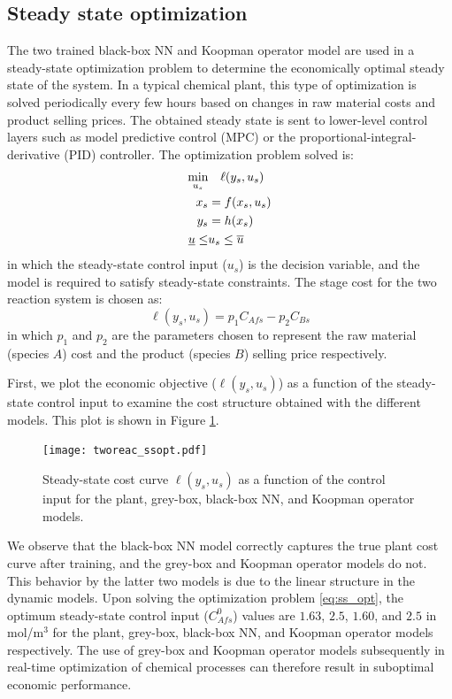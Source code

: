 \documentclass[10pt]{article}
\begin{document}
\subsection{Steady state optimization}
The two trained black-box NN and Koopman operator model are used in a steady-state optimization problem to determine the economically optimal
steady state of the system. In a typical chemical plant, this type of optimization is solved periodically every few hours based on changes in raw material costs and product selling prices. The obtained steady state is sent to lower-level control layers such as model predictive control (MPC) or the proportional-integral-derivative (PID) controller. The optimization problem solved is:
\begin{align} \label{eq:ss_opt}
  \underset{u_s}{\textnormal{min}} & \quad \ell(y_s, u_s) \\
  x_s &= f(x_s, u_s) \nonumber \\ 
  y_s &= h(x_s) \nonumber \\
  \underline{u} \leq &u_s \leq \overline{u} \nonumber
\end{align}
in which the steady-state control input ($u_s$) is the decision variable,  and the model is required to satisfy steady-state constraints. The stage cost for the two reaction system is chosen as:
\begin{equation*}
  \ell(y_s, u_s) = p_1C_{Afs} - p_2C_{Bs}
\end{equation*}
in which $p_1$ and $p_2$ are the parameters chosen to represent the raw material (species $A$) cost and the product (species $B$) selling price respectively. 

First, we plot the economic objective ($\ell(y_s, u_s)$) as a function of the 
steady-state control input to examine the cost structure obtained with the different models. This plot is shown in Figure \ref{fig:tworeac_sscost}.

\begin{figure}[!h]
  \centering
  \texttt{[image: tworeac\_ssopt.pdf]}
  \caption{Steady-state cost curve $\ell(y_s, u_s)$ as a function of the control input for the plant, grey-box, black-box NN, and Koopman operator models.}
  \label{fig:tworeac_sscost}
\end{figure}

We observe that the black-box NN model correctly captures the true plant cost curve after training, and the grey-box and Koopman operator models do not. This behavior by the latter two models is due to the linear structure in the dynamic models. Upon solving the optimization problem \eqref{eq:ss_opt}, the optimum steady-state control input ($C_{Afs}^0$) values are $1.63$, $2.5$, $1.60$, and $2.5$ in mol/m$^3$ for the plant, grey-box, black-box NN, and Koopman operator models respectively. The use of grey-box and Koopman operator models subsequently in real-time optimization of chemical processes can therefore result in suboptimal economic performance.
\end{document}

